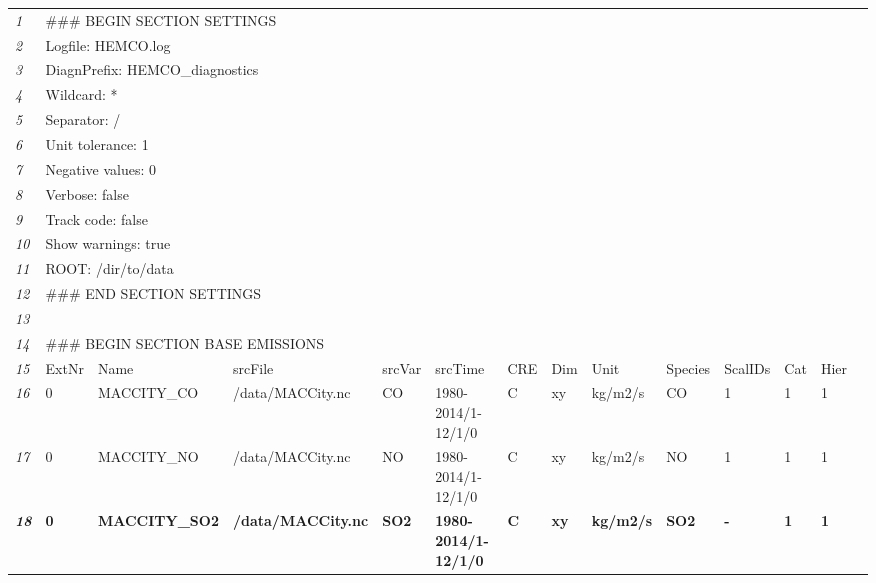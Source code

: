 \documentclass[12pt,a4paper]{article} %
\begin{document}
\hspace*{-1cm}
\ifdefined\HCode
   \begin{small}
\else
   \begin{scriptsize}
\fi
   \begin{tabular}{l|lllllllllllll} \hline
    \textit{1} & \multicolumn{3}{l}{\#\#\# BEGIN SECTION SETTINGS} & & & & & & & & & & \\
    \textit{2} & \multicolumn{3}{l}{Logfile: HEMCO.log} & & & & & & & & & & \\
    \textit{3} & \multicolumn{3}{l}{DiagnPrefix: HEMCO\_diagnostics} & & & & & & & & & & \\
    \textit{4} & \multicolumn{3}{l}{Wildcard: *} & & & & & & & & & & \\
    \textit{5} & \multicolumn{3}{l}{Separator: /} & & & & & & & & & & \\
    \textit{6} & \multicolumn{3}{l}{Unit tolerance: 1} & & & & & & & & & & \\
    \textit{7} & \multicolumn{3}{l}{Negative values: 0} & & & & & & & & & & \\
    \textit{8} & \multicolumn{3}{l}{Verbose: false} & & & & & & & & & & \\
    \textit{9} & \multicolumn{3}{l}{Track code: false} & & & & & & & & & & \\
    \textit{10} & \multicolumn{3}{l}{Show warnings: true} & & & & & & & & & & \\
    \textit{11} & \multicolumn{3}{l}{ROOT: /dir/to/data} & & & & & & & & & & \\
    \textit{12} & \multicolumn{3}{l}{\#\#\# END SECTION SETTINGS} & & & & & & & & & & \\  
    \textit{13} & & & & & & & & & & & & & \\
    \textit{14} & \multicolumn{3}{l}{\#\#\# BEGIN SECTION BASE EMISSIONS} & & & & & & & & & & \\
    \textit{15} & ExtNr & Name & srcFile & srcVar & srcTime & CRE & Dim & Unit & Species & ScalIDs & Cat & Hier \\
    \textit{16} & 0 & MACCITY\_CO & /data/MACCity.nc & CO & 1980-2014/1-12/1/0 & C & xy & kg/m2/s & CO & 1 & 1 & 1 \\
    \textit{17} & 0 & MACCITY\_NO & /data/MACCity.nc & NO & 1980-2014/1-12/1/0 & C & xy & kg/m2/s & NO & 1 & 1 & 1 \\
    \textit{\textbf{18}} & \textbf{0} & \textbf{MACCITY\_SO2} & \textbf{/data/MACCity.nc} & \textbf{SO2} & \textbf{1980-2014/1-12/1/0} & \textbf{C} & \textbf{xy} & \textbf{kg/m2/s} & \textbf{SO2} & \textbf{-} & \textbf{1} & \textbf{1} \\

\end{tabular}
\end{scriptsize}
\end{small}
\end{document}
